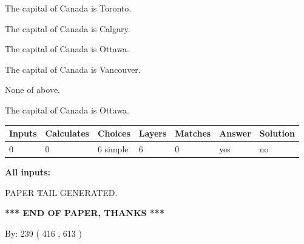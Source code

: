 \documentclass[12pt]{article}
\begin{document}
 
The capital of Canada is Toronto.
 
 
The capital of Canada is Calgary.
 
 
The capital of Canada is Ottawa.
 
 
The capital of Canada is Vancouver.
 
 
 None of above.
 
 
\noindent{}
 
 
The capital of Canada is Ottawa.
 
 
\noindent{}
 
 
   
   
   
   
\noindent\begin{tabular}{|l|l|l|l|l|l|l|}
 \hline
Inputs & Calculates & Choices & Layers & Matches & Answer & Solution \\ \hline
 0  & 
 0  & 
 6
  simple  
  & 
 6  & 
 0  & 
  yes & 
  no 
  \\ \hline
 \end{tabular}
   
   
   
   
\noindent{}
   
   
   
   
\noindent\vspace{0.1in}\hspace{-0.08in} {\textbf{\Large{All inputs: }}}
   
   
   
   
   
   
 \vspace{0.2in}
 
   
   
\vspace{2.0in} PAPER TAIL GENERATED.
   
   
   
   
\vspace{1.0in} 
{\textbf{\large{ *** END OF PAPER, THANKS *** }}} 
   
   
\hspace{1.0in} By: 
 239 ( 416 ,  613 )
   
\end{document}
